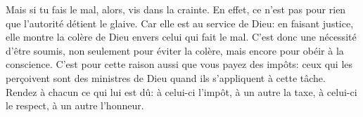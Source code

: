 Mais si tu fais le mal, alors, vis dans la crainte.
	En effet, ce n’est pas pour rien que l’autorité détient le glaive.
Car elle est au service de Dieu:
	en faisant justice, elle montre la colère de Dieu
		envers celui qui fait le mal.
C’est donc une nécessité d’être soumis,
	non seulement pour éviter la colère, mais encore pour obéir à la conscience.
C’est pour cette raison aussi que vous payez des impôts:
	ceux qui les perçoivent sont des ministres de Dieu
		quand ils s’appliquent à cette tâche.
Rendez à chacun ce qui lui est dû:
	à celui-ci l’impôt, à un autre la taxe,
	à celui-ci le respect, à un autre l’honneur.
